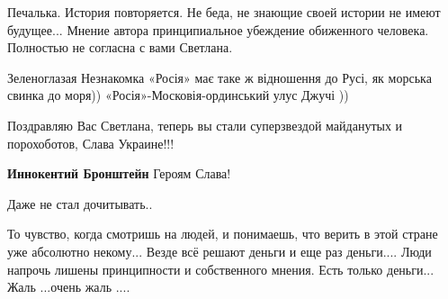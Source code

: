 \begin{itemize}
 
Печалька. История повторяется. Не беда, не знающие своей истории не имеют будущее... Мнение автора принципиальное убеждение обиженного человека. Полностью не согласна с вами Светлана.

\begin{itemize}
 
Зеленоглазая Незнакомка «Росія» має таке ж відношення до Русі, як морська свинка до моря))
«Росія»-Московія-ординський улус Джучі ))
\end{itemize}

 
Поздравляю Вас Светлана, теперь вы стали суперзвездой майданутых и порохоботов, Слава Украине!!!

\begin{itemize}
 
\textbf{Иннокентий Бронштейн} Героям Слава!
\end{itemize}

 
Даже не стал дочитывать..

 

То чувство, когда смотришь на людей, и понимаешь, что верить в этой стране уже
абсолютно некому... Везде всё решают деньги и еще раз деньги.... Люди напрочь
лишены принципности и собственного мнения. Есть только деньги... Жаль ...очень
жаль ....



\end{itemize}
